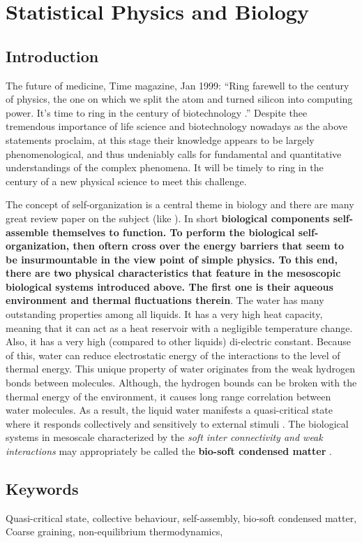 \chapter{Statistical Physics and Biology}


\section{Introduction}

The future of medicine, Time magazine, Jan 1999: ``Ring farewell to the century of physics, the one on which we split the atom and turned silicon into computing power. It's time to ring in the century of biotechnology \cite{Sung2018}.'' Despite thee tremendous importance of life science and biotechnology nowadays as the above statements proclaim, at this stage their knowledge appears to be largely phenomenological, and thus undeniably calls for fundamental and quantitative understandings of the complex phenomena. It will be timely to ring in the century of a new physical science to meet this challenge.

The concept of self-organization is a central theme in biology and there are many great review paper on the subject (like \cite{Pochan2021,McManus2016,Whitelam2015}). In short \textbf{biological components self-assemble themselves to function. To perform the biological self-organization, then oftern cross over the energy barriers that seem to be insurmountable in the view point of simple physics. To this end, there are two physical characteristics that feature in the mesoscopic biological systems introduced above. The first one is their aqueous environment and thermal fluctuations therein}. The water has many outstanding properties among all liquids. It has a very high heat capacity, meaning that it can act as a heat reservoir with a negligible temperature change. Also, it has a very high (compared to other liquids) di-electric constant. Because of this, water can reduce electrostatic energy of the interactions to the level of thermal energy. This unique property of water originates from the weak hydrogen bonds between molecules. Although, the hydrogen bounds can be broken with the thermal energy of the environment, it causes long range correlation between water molecules. As a result, the liquid water manifests a quasi-critical state where it responds collectively and sensitively to external stimuli \cite{Sung2018,Wiggins1990,Bagchi2013}. The biological systems in mesoscale characterized by the \textit{soft inter connectivity and weak interactions} may appropriately be called the \textbf{bio-soft condensed matter} \cite{Sung2018}. 







\section{Keywords}
Quasi-critical state, collective behaviour, self-assembly, bio-soft condensed matter, Coarse graining, non-equilibrium thermodynamics, 